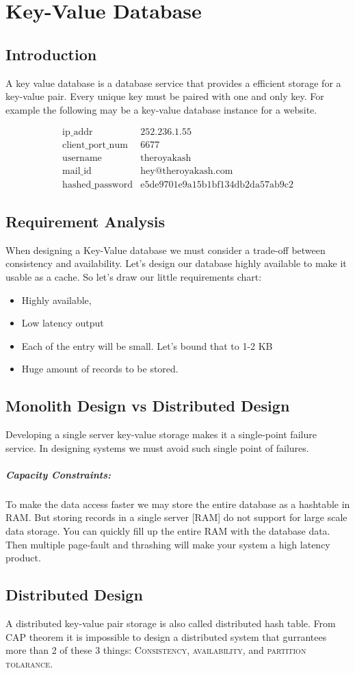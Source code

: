 \chapter{Key-Value Database}
\section{Introduction}

A key value database is a database service that provides a efficient storage for a key-value pair. Every unique key must be paired with one and only key. For example the following may be a key-value database instance for a website.

$$\begin{array}{ll}
	\mbox{ip\_addr} & \mbox{252.236.1.55} \\
	\mbox{client\_port\_num} & \mbox{6677} \\
	\mbox{username} & \mbox{theroyakash} \\
	\mbox{mail\_id} & \mbox{hey@theroyakash.com} \\
	\mbox{hashed\_password} & \mbox{e5de9701e9a15b1bf134db2da57ab9c2}	
\end{array}$$

\section{Requirement Analysis}
When designing a Key-Value database we must consider a trade-off between consistency and availability. Let's design our database highly available to make it usable as a cache. So let's draw our little requirements chart:

\begin{itemize}
	\item Highly available,
	\item Low latency output
	\item Each of the entry will be small. Let's bound that to 1-2 KB
	\item Huge amount of records to be stored.
\end{itemize}

\section{Monolith Design vs Distributed Design}
Developing a single server key-value storage makes it a single-point failure service. In designing systems we must avoid such single point of failures.

\paragraph{Capacity Constraints:}
To make the data access faster we may store the entire database as a hashtable in RAM. But storing records in a single server [RAM] do not support for large scale data storage. You can quickly fill up the entire RAM with the database data. Then multiple page-fault and thrashing will make your system a high latency product.

\section{Distributed Design}
A distributed key-value pair storage is also called distributed hash table. From CAP theorem it is impossible to design a distributed system that gurrantees more than 2 of these 3 things: \textsc{Consistency, availability,} and \textsc{partition tolarance}.
